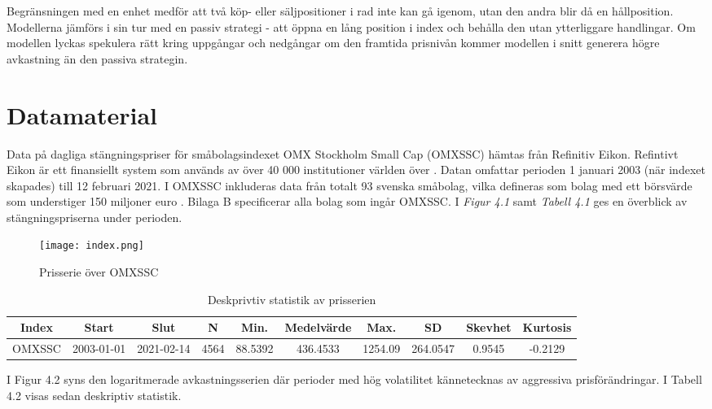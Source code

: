 \documentclass[11pt]{article}
\numberwithin{equation}{section}
\numberwithin{table}{section}
\numberwithin{figure}{section}
\begin{document}
Begränsningen med en enhet medför att två köp- eller säljpositioner i rad inte kan gå igenom, utan den andra  blir då en hållposition. Modellerna jämförs i sin tur med en passiv strategi - att öppna en lång position i index och behålla den utan ytterliggare handlingar. Om modellen lyckas spekulera rätt kring uppgångar och nedgångar om den framtida prisnivån kommer modellen i snitt generera högre avkastning än den passiva strategin. 

\newpage
\section{Datamaterial}

Data på dagliga stängningspriser för småbolagsindexet OMX Stockholm Small Cap (OMXSSC) hämtas från Refinitiv Eikon. Refintivt Eikon är ett finansiellt system som används av över 40 000 institutioner världen över \parencite{Eikon}. Datan omfattar perioden 1 januari 2003 (när indexet skapades) till 12 februari 2021. I OMXSSC inkluderas data från totalt 93 svenska småbolag, vilka defineras som bolag med ett börsvärde som understiger 150 miljoner euro \parencite{smabalagsdefinition}. Bilaga B specificerar alla bolag som ingår OMXSSC. I \emph{Figur 4.1} samt \textit{Tabell 4.1} ges en överblick av stängningspriserna under perioden. 

\begin{figure}[H]
\caption{Prisserie över OMXSSC}
\texttt{[image: index.png]}
\centering
\end{figure}

\begin{table}[H]
\caption{Deskprivtiv statistik av prisserien}
\begin{adjustbox}{width=1\textwidth}
\begin{tabular}{|c|c|c|c|c|c|c|c|c|c|}
\hline
Index & Start & Slut & N & Min. & Medelvärde & Max. & SD & Skevhet & Kurtosis \\ \hline
OMXSSC   & 2003-01-01 & 2021-02-14 & 4564 & 88.5392  & 436.4533 & 1254.09 & 264.0547 & 0.9545 & -0.2129 \\ \hline
\end{tabular}
\end{adjustbox}
\end{table}

I Figur 4.2 syns den logaritmerade avkastningsserien där perioder med hög volatilitet kännetecknas av aggressiva prisförändringar. I Tabell 4.2 visas sedan deskriptiv statistik. 
\end{document}
